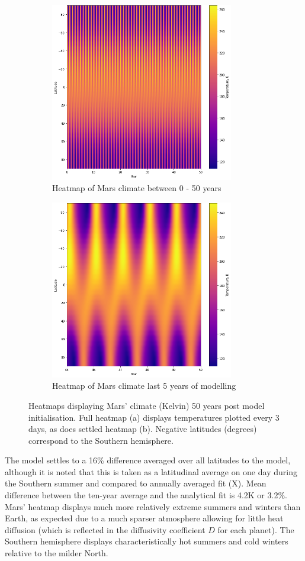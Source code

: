 \documentclass[12pt,onecolumn]{revtex4-2}    %
\begin{document}
\begin{figure}
\begin{subfigure}{.5\textwidth}
  \centering
  \includegraphics[width = 8cm]{Mars50yrsHeatmap.png}
  \caption{Heatmap of Mars climate between 0 - 50 years}
  \label{fig:sub1}
\end{subfigure}%
\begin{subfigure}{.5\textwidth}
  \centering
  \includegraphics[width=8cm]{Mars5yrsHeatmap.png}
  \caption{Heatmap of Mars climate last 5 years of modelling}
  \label{fig:sub2}
\end{subfigure}
\raggedright
\caption{Heatmaps displaying Mars' climate (Kelvin) 50 years post model initialisation. Full heatmap (a) displays temperatures plotted every 3 days, as does settled heatmap (b). Negative latitudes (degrees) correspond to the Southern hemisphere.}
\label{fig:test}
\end{figure}

The model settles to a 16\% difference averaged over all latitudes to the model, although it is noted that this is taken as a latitudinal average on one day during the Southern summer and compared to annually averaged fit (X). Mean difference between the ten-year average and the analytical fit is 4.2K or 3.2\%.
Mars' heatmap displays much more relatively extreme summers and winters than Earth, as expected due to a much sparser atmosphere allowing for little heat diffusion (which is reflected in the diffusivity coefficient $D$ for each planet). The Southern hemisphere displays characteristically hot summers and cold winters relative to the milder North.
\end{document}
